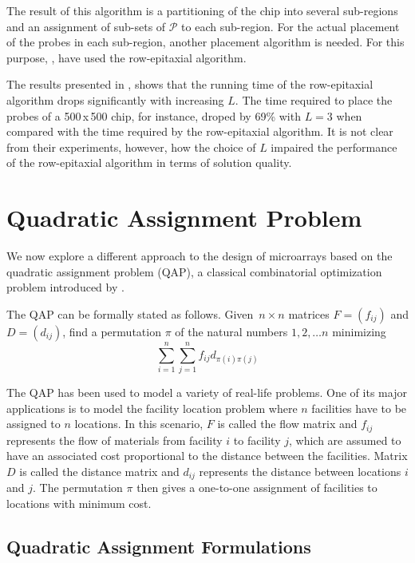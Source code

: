 \documentclass{bioinfo}
\begin{document}
The result of this algorithm is a partitioning of the chip into several sub-regions and an assignment of sub-sets of $\mathcal{P}$ to each sub-region. For the actual placement of the probes in each sub-region, another placement algorithm is needed. For this purpose, \citealp{KAHNG03B}, have used the row-epitaxial algorithm.

The results presented in \citealp{KAHNG03B}, shows that the running time of the row-epitaxial algorithm drops significantly with increasing $L$. The time required to place the probes of a 500\,x\,500 chip, for instance, droped by 69\% with $L = 3$ when compared with the time required by the row-epitaxial algorithm. It is not clear from their experiments, however, how the choice of $L$ impaired the performance of the row-epitaxial algorithm in terms of solution quality.

\section{Quadratic Assignment Problem}
\label{sec:qap}

We now explore a different approach to the design of microarrays based on the quadratic assignment problem (QAP), a classical combinatorial optimization problem introduced by \citealp{KOOPMANS57}.

The QAP can be formally stated as follows. Given~$n \times n$ matrices $F = (f_{ij})$ and $D = (d_{ij})$, find a permutation $\pi$ of the natural numbers $1, 2, \ldots n$ minimizing
\begin{equation}
\label{eq:qap_def}
\sum_{i=1}^{n} \sum_{j=1}^{n} f_{ij} d_{\pi(i)\pi(j)}
\end{equation}

The QAP has been used to model a variety of real-life problems. One of its major applications is to model the facility location problem where $n$ facilities have to be assigned to $n$ locations. In this scenario, $F$ is called the flow matrix and $f_{ij}$ represents the flow of materials from facility $i$ to facility $j$, which are assumed to have an associated cost proportional to the distance between the facilities. Matrix $D$ is called the distance matrix and $d_{ij}$ represents the distance between locations $i$ and $j$. The permutation $\pi$ then gives a one-to-one assignment of facilities to locations with minimum cost.

\subsection{Quadratic Assignment Formulations}
\label{sec:qap_form}
\end{document}
